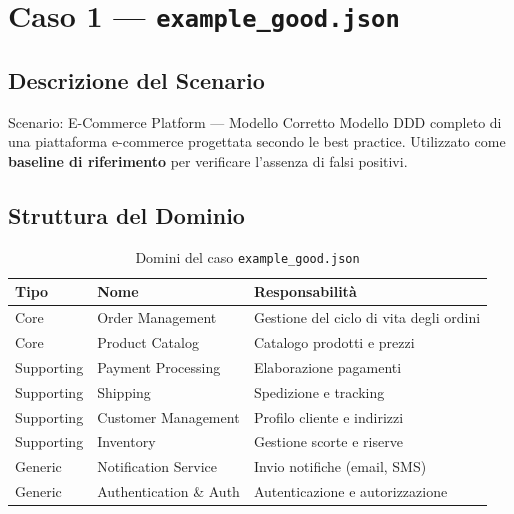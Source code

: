 \documentclass[12pt,a4paper]{report}
\begin{document}
\clearpage

\chapter{Caso 1 --- \texttt{example\_good.json}}

\section{Descrizione del Scenario}

\begin{technicalbox}{Scenario: E-Commerce Platform --- Modello Corretto}
Modello DDD completo di una piattaforma e-commerce progettata secondo le best practice.
Utilizzato come \textbf{baseline di riferimento} per verificare l'assenza di falsi positivi.
\end{technicalbox}

\section{Struttura del Dominio}

\begin{table}[H]
\centering
\renewcommand{\arraystretch}{1.3}
\begin{tabularx}{\textwidth}{l l X}
\toprule
\textbf{Tipo} & \textbf{Nome} & \textbf{Responsabilità} \\
\midrule
Core       & Order Management      & Gestione del ciclo di vita degli ordini \\
Core       & Product Catalog       & Catalogo prodotti e prezzi \\
Supporting & Payment Processing    & Elaborazione pagamenti \\
Supporting & Shipping              & Spedizione e tracking \\
Supporting & Customer Management   & Profilo cliente e indirizzi \\
Supporting & Inventory             & Gestione scorte e riserve \\
Generic    & Notification Service  & Invio notifiche (email, SMS) \\
Generic    & Authentication \& Auth & Autenticazione e autorizzazione \\
\bottomrule
\end{tabularx}
\caption{Domini del caso \texttt{example\_good.json}}
\label{tab:good-domains}
\end{table}
\end{document}
